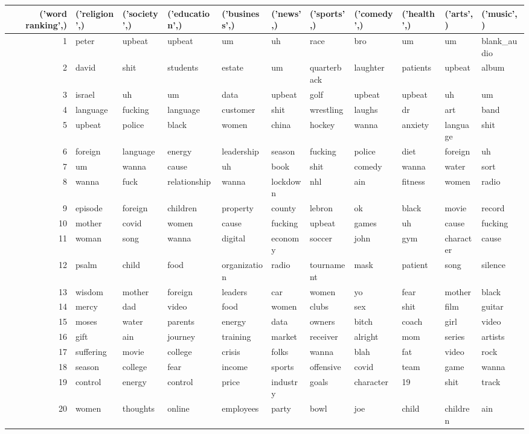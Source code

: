 \begin{tabular}{rllllllllll}
\toprule
('word ranking',) & ('religion',) & ('society',) & ('education',) & ('business',) & ('news',) & ('sports',) & ('comedy',) & ('health',) & ('arts',) & ('music',) \\
\midrule
1 & peter & upbeat & upbeat & um & uh & race & bro & um & um & blank_audio \\
2 & david & shit & students & estate & um & quarterback & laughter & patients & upbeat & album \\
3 & israel & uh & um & data & upbeat & golf & upbeat & upbeat & uh & um \\
4 & language & fucking & language & customer & shit & wrestling & laughs & dr & art & band \\
5 & upbeat & police & black & women & china & hockey & wanna & anxiety & language & shit \\
6 & foreign & language & energy & leadership & season & fucking & police & diet & foreign & uh \\
7 & um & wanna & cause & uh & book & shit & comedy & wanna & water & sort \\
8 & wanna & fuck & relationship & wanna & lockdown & nhl & ain & fitness & women & radio \\
9 & episode & foreign & children & property & county & lebron & ok & black & movie & record \\
10 & mother & covid & women & cause & fucking & upbeat & games & uh & cause & fucking \\
11 & woman & song & wanna & digital & economy & soccer & john & gym & character & cause \\
12 & psalm & child & food & organization & radio & tournament & mask & patient & song & silence \\
13 & wisdom & mother & foreign & leaders & car & women & yo & fear & mother & black \\
14 & mercy & dad & video & food & women & clubs & sex & shit & film & guitar \\
15 & moses & water & parents & energy & data & owners & bitch & coach & girl & video \\
16 & gift & ain & journey & training & market & receiver & alright & mom & series & artists \\
17 & suffering & movie & college & crisis & folks & wanna & blah & fat & video & rock \\
18 & season & college & fear & income & sports & offensive & covid & team & game & wanna \\
19 & control & energy & control & price & industry & goals & character & 19 & shit & track \\
20 & women & thoughts & online & employees & party & bowl & joe & child & children & ain \\
\bottomrule
\end{tabular}
